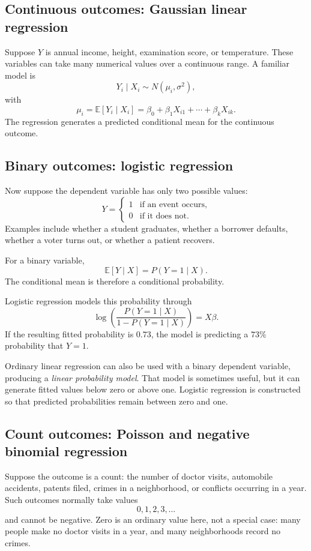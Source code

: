\documentclass[11pt]{report}
\newcommand{\E}{\mathbb{E}}
\begin{document}
\subsection{Continuous outcomes: Gaussian linear regression}

Suppose \(Y\) is annual income, height, examination score, or temperature. These variables can take many numerical values over a continuous range. A familiar model is
\[
Y_i\mid X_i \sim N(\mu_i,\sigma^2),
\]
with
\[
\mu_i=\E[Y_i\mid X_i]
=
\beta_0+\beta_1X_{i1}+\cdots+\beta_kX_{ik}.
\]
The regression generates a predicted conditional mean for the continuous outcome.

\subsection{Binary outcomes: logistic regression}

Now suppose the dependent variable has only two possible values:
\[
Y=
\begin{cases}
1 & \text{if an event occurs},\\
0 & \text{if it does not.}
\end{cases}
\]
Examples include whether a student graduates, whether a borrower defaults, whether a voter turns out, or whether a patient recovers.

For a binary variable,
\[
\E[Y\mid X]=P(Y=1\mid X).
\]
The conditional mean is therefore a conditional probability.

Logistic regression models this probability through
\[
\log\left(
\frac{P(Y=1\mid X)}
{1-P(Y=1\mid X)}
\right)
=
X\beta.
\]
If the resulting fitted probability is \(0.73\), the model is predicting a \(73\%\) probability that \(Y=1\).

Ordinary linear regression can also be used with a binary dependent variable, producing a \emph{linear probability model}. That model is sometimes useful, but it can generate fitted values below zero or above one. Logistic regression is constructed so that predicted probabilities remain between zero and one.

\subsection{Count outcomes: Poisson and negative binomial regression}

Suppose the outcome is a count: the number of doctor visits, automobile accidents, patents filed, crimes in a neighborhood, or conflicts occurring in a year. Such outcomes normally take values
\[
0,1,2,3,\ldots
\]
and cannot be negative. Zero is an ordinary value here, not a special case: many people make no doctor visits in a year, and many neighborhoods record no crimes.
\end{document}
